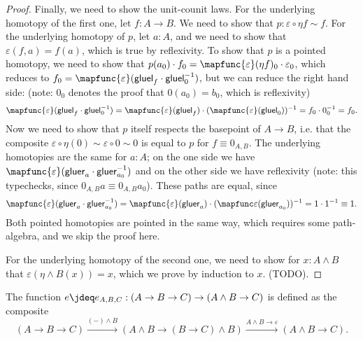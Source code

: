 \documentclass{article}
\newcommand{\pmap}{\to}
\newcommand{\lpmap}{\xrightarrow}
\newcommand{\smsh}{\wedge}
\renewcommand{\epsilon}{\varepsilon}
\newcommand{\tr}{\cdot}
\renewcommand{\o}{\ensuremath{\circ}}
\newcommand{\gluel}{\mathsf{gluel}}
\newcommand{\gluer}{\mathsf{gluer}}
\newcommand{\sy}{^{-1}}
\begin{document}
\begin{proof}
  Finally, we need to show the unit-counit laws. For the underlying homotopy of the first one, let
  $f:A\to B$. We need to show that $p:\epsilon\o\eta f\sim f$. For the underlying homotopy of $p$,
  let $a:A$, and we need to show that $\epsilon(f,a)=f(a)$, which is true by reflexivity. To show
  that $p$ is a pointed homotopy, we need to show that
  $p(a_0)\tr f_0=\mapfunc{\epsilon}(\eta f)_0\tr \epsilon_0$, which reduces to
  $f_0=\mapfunc{\epsilon}(\gluel_f\tr\gluel_0\sy)$, but we can reduce the right hand side: (note:
  $0_0$ denotes the proof that $0(a_0)=b_0$, which is reflexivity)
  $$\mapfunc{\epsilon}(\gluel_f\tr\gluel_0\sy)=\mapfunc{\epsilon}(\gluel_f)\tr(\mapfunc{\epsilon}(\gluel_0))\sy=f_0\tr 0_0\sy=f_0.$$
  Now we need to show that $p$ itself respects the basepoint of $A\to B$, i.e. that the composite
  $\epsilon\o\eta(0)\sim\epsilon\o0\sim0$ is equal to $p$ for $f\equiv 0_{A,B}$. The underlying
  homotopies are the same for $a : A$; on the one side we have
  $\mapfunc{\epsilon}(\gluer_{a}\tr\gluer_{a_0}\sy)$ and on the other side we have reflexivity
  (note: this typechecks, since $0_{A,B}a\equiv0_{A,B}a_0$). These paths are equal, since
  $$\mapfunc{\epsilon}(\gluer_{a}\tr\gluer_{a_0}\sy)=\mapfunc{\epsilon}(\gluer_{a})\tr(\mapfunc\epsilon(\gluer_{a_0}))\sy=1\cdot1\sy\equiv1.$$
  Both pointed homotopies are pointed in the same way, which requires some path-algebra, and we skip
  the proof here.

  For the underlying homotopy of the second one, we need to show for $x:A\smsh B$ that
  $\epsilon(\eta\smsh B(x))=x$, which we prove by induction to $x$. (TODO).
\end{proof}

\begin{defn}
The function $e\jdeq e_{A,B,C}:(A\pmap B\pmap C)\pmap(A\smsh B\pmap C)$ is defined as the composite
$$(A\pmap B\pmap C)\lpmap{({-})\smsh B}(A\smsh B\pmap (B\pmap C)\smsh B)\lpmap{A\smsh B \pmap\epsilon}(A\smsh B\pmap C).$$
\end{defn}
\end{document}
